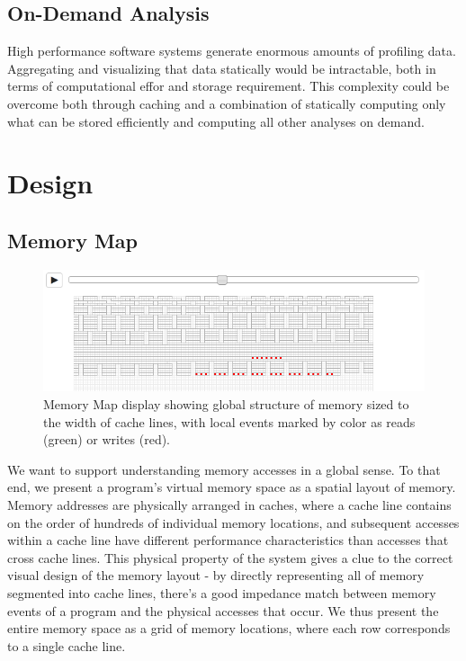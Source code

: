 \documentclass[annual]{acmsiggraph}
\begin{document}
  \subsection{On-Demand Analysis}
   
  High performance software systems generate enormous amounts of profiling data.
  Aggregating and visualizing that data statically would be intractable, 
    both in terms of computational effor and storage requirement.
  This complexity could be overcome both through caching and a combination of statically computing only what can
    be stored efficiently and computing all other analyses on demand.

\section{Design}\label{ch_d}
  \subsection{Memory Map}

  	\begin{figure}[t]
  		\centering
      \includegraphics[scale=0.40]{images/memmap.png}
  		\caption{Memory Map display showing global structure of memory sized to the width of cache lines, with local events marked by color as reads (green) or writes (red).}
      \label{fig:memmap}
  	\end{figure}
  
  We want to support understanding memory accesses in a global sense. To that end, we present a program's virtual memory space as a spatial layout of memory. Memory addresses are physically arranged in caches, where a cache line contains on the order of hundreds of individual memory locations, and subsequent accesses within a cache line have different performance characteristics than accesses that cross cache lines. This physical property of the system gives a clue to the correct visual design of the memory layout - by directly representing all of memory segmented into cache lines, there's a good impedance match between memory events of a program and the physical accesses that occur. We thus present the entire memory space as a grid of memory locations, where each row corresponds to a single cache line.
  
\end{document}
